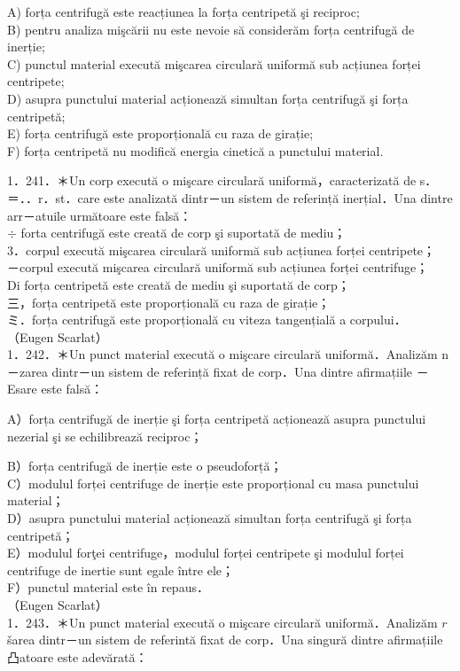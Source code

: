 \documentclass[10pt]{article}
\begin{document}
\begin{itemize}
A) forța centrifugă este reacțiunea la forța centripetă şi reciproc;\\
B) pentru analiza mişcării nu este nevoie să considerăm forța centrifugă de inerție;\\
C) punctul material execută mişcarea circulară uniformă sub acțiunea forței centripete;\\
D) asupra punctului material acționează simultan forța centrifugă şi forța centripetă;\\
E) forța centrifugă este proporțională cu raza de girație;\\
F) forța centripetă nu modifică energia cinetică a punctului material.
\end{itemize}

1．241．＊Un corp execută o mişcare circulară uniformă，caracterizată de s．＝．．r．st．care este analizată dintr－un sistem de referință inerțial．Una dintre arr－atuile următoare este falsă：\\
$\div$ forta centrifugă este creată de corp şi suportată de mediu；\\
3．corpul execută mişcarea circulară uniformă sub acțiunea forței centripete；\\
－corpul execută mişcarea circulară uniformă sub acțiunea forței centrifuge；\\
Di forța centripetă este creată de mediu şi suportată de corp；\\
三，forța centripetă este proporțională cu raza de girație；\\
ミ．forța centrifugă este proporțională cu viteza tangențială a corpului．\\
（Eugen Scarlat）\\
1．242．＊Un punct material execută o mişcare circulară uniformă．Analizăm n－zarea dintr－un sistem de referință fixat de corp．Una dintre afirmațiile －Esare este falsă：

A）forța centrifugă de inerție şi forța centripetă acționează asupra punctului nezerial şi se echilibrează reciproc；

B）forța centrifugă de inerție este o pseudoforță；\\
C）modulul forței centrifuge de inerție este proporțional cu masa punctului material；\\
D）asupra punctului material acționează simultan forța centrifugă şi forța centripetă；\\
E）modulul forţei centrifuge，modulul forței centripete şi modulul forței centrifuge de inertie sunt egale între ele；\\
F）punctul material este în repaus．\\
（Eugen Scarlat）\\
1．243．＊Un punct material execută o mişcare circulară uniformă．Analizăm $r$ šarea dintr－un sistem de referintă fixat de corp．Una singură dintre afirmațiile凸atoare este adevărată：
\end{document}

